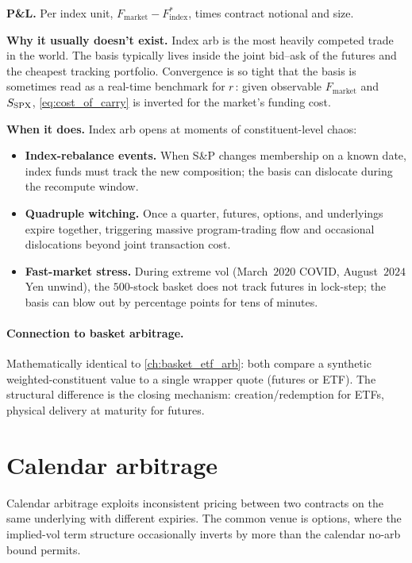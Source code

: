 \textbf{P\&L.} Per index unit, $F_{\text{market}} -
F^*_{\text{index}}$, times contract notional and size.

\textbf{Why it usually doesn't exist.} Index arb is the most
heavily competed trade in the world. The basis typically lives
inside the joint bid--ask of the futures and the cheapest
tracking portfolio. Convergence is so tight that the basis is
sometimes read as a real-time benchmark for $r$: given
observable $F_{\text{market}}$ and $S_{\text{SPX}}$,
\eqref{eq:cost_of_carry} is inverted for the market's funding
cost.

\textbf{When it does.} Index arb opens at moments of
constituent-level chaos:
\begin{itemize}
  \item \textbf{Index-rebalance events.} When S\&P changes
  membership on a known date, index funds must track the new
  composition; the basis can dislocate during the recompute
  window.
  \item \textbf{Quadruple witching.} Once a quarter, futures,
  options, and underlyings expire together, triggering massive
  program-trading flow and occasional dislocations beyond joint
  transaction cost.
  \item \textbf{Fast-market stress.} During extreme vol
  (March~$2020$ COVID, August~$2024$ Yen unwind), the $500$-stock
  basket does not track futures in lock-step; the basis can blow
  out by percentage points for tens of minutes.
\end{itemize}

\paragraph{Connection to basket arbitrage.} Mathematically
identical to \cref{ch:basket_etf_arb}: both compare a synthetic
weighted-constituent value to a single wrapper quote (futures or
ETF). The structural difference is the closing mechanism:
creation/redemption for ETFs, physical delivery at maturity for
futures.

\section{Calendar arbitrage}
\label{sec:ch13_calendar}

Calendar arbitrage exploits inconsistent pricing between two
contracts on the same underlying with different expiries. The
common venue is options, where the implied-vol term structure
occasionally inverts by more than the calendar no-arb bound
permits.

